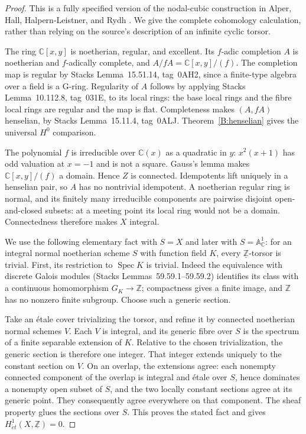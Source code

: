 \begin{proof}
This is a fully specified version of the nodal-cubic construction
in Alper, Hall, Halpern-Leistner, and Rydh
\cite[Example~3.1]{C_AHHR2024}. We give the complete cohomology
calculation, rather than relying on the source's description of an
infinite cyclic torsor.

The ring $\mathbb C[x,y]$ is noetherian, regular, and excellent.
Its $f$-adic completion $A$ is noetherian and $f$-adically complete,
and $A/fA=\mathbb C[x,y]/(f)$. The completion map is regular by
Stacks Lemma~15.51.14, tag~0AH2, since a finite-type algebra over a
field is a G-ring. Regularity of $A$ follows by applying Stacks
Lemma~10.112.8, tag~031E, to its local rings: the base local rings
and the fibre local rings are regular and the map is flat.
Completeness makes $(A,fA)$ henselian, by Stacks
Lemma~15.11.4, tag~0ALJ. Theorem~\ref{B:henselian} gives the
universal $H^0$ comparison.

The polynomial $f$ is irreducible over $\mathbb C(x)$ as a
quadratic in $y$: $x^2(x+1)$ has odd valuation at $x=-1$ and is
not a square. Gauss's lemma makes $\mathbb C[x,y]/(f)$ a domain.
Hence $Z$ is connected. Idempotents lift uniquely in a henselian
pair, so $A$ has no nontrivial idempotent. A noetherian regular
ring is normal, and its finitely many irreducible components are
pairwise disjoint open-and-closed subsets: at a meeting point its
local ring would not be a domain. Connectedness therefore makes
$X$ integral.

We use the following elementary fact with $S=X$ and later with
$S=\mathbb A^1_{\mathbb C}$: for an integral normal noetherian
scheme $S$ with function field $K$, every
$\underline{\mathbb Z}$-torsor is trivial. First, its restriction
to $\operatorname{Spec}K$ is trivial. Indeed the equivalence with
discrete Galois modules (Stacks Lemmas~59.59.1--59.59.2) identifies
its class with a continuous homomorphism $G_K\to\mathbb Z$;
compactness gives a finite image, and $\mathbb Z$ has no nonzero
finite subgroup. Choose such a generic section.

Take an \'etale cover trivializing the torsor, and refine it by
connected noetherian normal schemes $V$. Each $V$ is integral,
and its generic fibre over $S$ is the spectrum of a finite
separable extension of $K$. Relative to the chosen trivialization,
the generic section is therefore one integer. That integer
extends uniquely to the constant section on $V$. On an overlap,
the extensions agree: each nonempty connected component of the
overlap is integral and \'etale over $S$, hence dominates a
nonempty open subset of $S$, and the two locally constant sections
agree at its generic point. They consequently agree everywhere
on that component. The sheaf property glues the sections over
$S$. This proves the stated fact and gives
$H^1_{\acute et}(X,\underline{\mathbb Z})=0$.


\end{proof}

